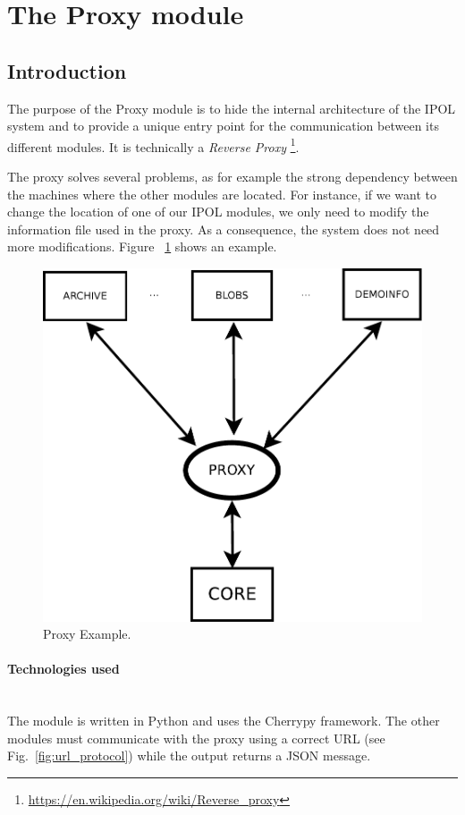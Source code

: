\section{The Proxy module}

\subsection{Introduction}
\label{sec:proxy_introduction}

The purpose of the Proxy module is to hide the internal architecture of the IPOL system and to provide a unique entry point for the communication between its different modules. It is technically a \emph{Reverse Proxy} \footnote{\url{https://en.wikipedia.org/wiki/Reverse_proxy}}.

The proxy solves several problems, as for example the strong dependency between the machines where the other modules are located. For instance, if we want to change the location of one of our IPOL modules, we only need to modify the information file used in the proxy. As a consequence, the system does not need more modifications. Figure ~\ref{fig:proxy_example} shows an example.

\begin{figure}[!ht]
\centering
\includegraphics[width=0.5\columnwidth]{proxy/images/proxy_diagram.pdf}
\caption{Proxy Example.} 
\label{fig:proxy_example}
\end{figure}

\paragraph{Technologies used} \hspace{0pt} \\
The module is written in Python and uses the Cherrypy framework. The other modules must communicate with the proxy using a correct URL (see Fig.~\ref{fig:url_protocol}) while the output returns a JSON message.

